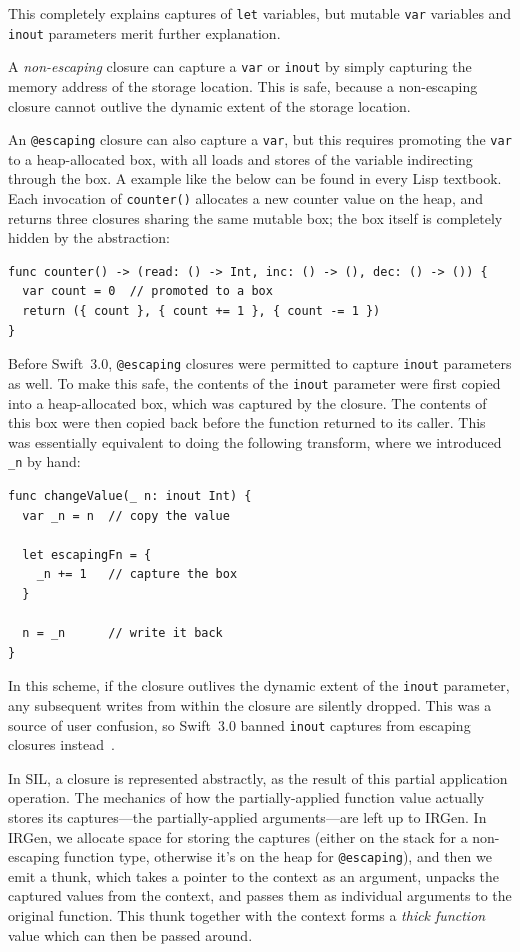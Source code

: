 \documentclass[../generics]{subfiles}
\begin{document}
This completely explains captures of \texttt{let} variables, but mutable \texttt{var} variables and \texttt{inout} parameters merit further explanation.

A \emph{non-escaping} closure can capture a \texttt{var} or \texttt{inout} by simply capturing the memory address of the storage location. This is safe, because a non-escaping closure cannot outlive the dynamic extent of the storage location.

An \texttt{@escaping} closure can also capture a \texttt{var}, but this requires promoting the \texttt{var} to a heap-allocated box, with all loads and stores of the variable indirecting through the box. A example like the below can be found in every Lisp textbook. Each invocation of \texttt{counter()} allocates a new counter value on the heap, and returns three closures sharing the same mutable box; the box itself is completely hidden by the abstraction:
\begin{Verbatim}
func counter() -> (read: () -> Int, inc: () -> (), dec: () -> ()) {
  var count = 0  // promoted to a box
  return ({ count }, { count += 1 }, { count -= 1 })
}
\end{Verbatim}

Before Swift~3.0, \texttt{@escaping} closures were permitted to capture \texttt{inout} parameters as well. To make this safe, the contents of the \texttt{inout} parameter were first copied into a heap-allocated box, which was captured by the closure. The contents of this box were then copied back before the function returned to its caller. This was essentially equivalent to doing the following transform, where we introduced \verb|_n| by hand:
\begin{Verbatim}
func changeValue(_ n: inout Int) {
  var _n = n  // copy the value

  let escapingFn = {
    _n += 1   // capture the box
  }

  n = _n      // write it back
}
\end{Verbatim}
In this scheme, if the closure outlives the dynamic extent of the \texttt{inout} parameter, any subsequent writes from within the closure are silently dropped. This was a source of user confusion, so Swift~3.0 banned \texttt{inout} captures from escaping closures instead~\cite{se0035}.

In SIL, a closure is represented abstractly, as the result of this partial application operation. The mechanics of how the partially-applied function value actually stores its captures---the partially-applied arguments---are left up to IRGen. In IRGen, we allocate space for storing the captures (either on the stack for a non-escaping function type, otherwise it's on the heap for \texttt{@escaping}), and then we emit a thunk, which takes a pointer to the context as an argument, unpacks the captured values from the context, and passes them as individual arguments to the original function. This thunk together with the context forms a \emph{thick function} value which can then be passed around.
\end{document}
